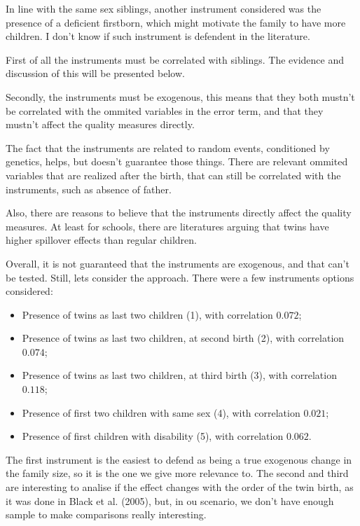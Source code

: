\documentclass[12pt]{article}
\begin{document}
In line with the same sex siblings, another instrument considered was the presence of a deficient firstborn, which might motivate the family to have more children. I don't know if such instrument is defendent in the literature.

First of all the instruments must be correlated with siblings. The evidence and discussion of this will be presented below. 

Secondly, the instruments must be exogenous, this means that they both mustn't be correlated with the ommited variables in the error term, and that they mustn't affect the quality measures directly.

The fact that the instruments are related to random events, conditioned by genetics, helps, but doesn't guarantee those things. There are relevant ommited variables that are realized after the birth, that can still be correlated with the instruments, such as absence of father.

Also, there are reasons to believe that the instruments directly affect the quality measures. At least for schools, there are literatures arguing that twins have higher spillover effects than regular children.

Overall, it is not guaranteed that the instruments are exogenous, and that can't be tested. Still, lets consider the approach. There were a few instruments options considered:

\begin{itemize}
    \item Presence of twins as last two children (1), with correlation $0.072$;
    \item Presence of twins as last two children, at second birth (2), with correlation $0.074$;
    \item Presence of twins as last two children, at third birth (3), with correlation $0.118$;
    \item Presence of first two children with same sex (4), with correlation $0.021$;
    \item Presence of first children with disability (5), with correlation $0.062$.
\end{itemize}

The first instrument is the easiest to defend as being a true exogenous change in the family size, so it is the one we give more relevance to. The second and third are interesting to analise if the effect changes with the order of the twin birth, as it was done in Black et al. (2005), but, in ou scenario, we don't have enough sample to make comparisons really interesting.
\end{document}
